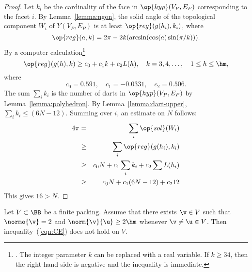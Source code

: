 \begin{proof}
Let $k_i$ be the cardinality of the face in $\op{hyp}(V_P,E_P)$
corresponding to the facet $i$.  By Lemma~\ref{lemma:ngon}, the solid
angle of the topological component $W_i$ of $Y(V_P,E_P)$ is at least
$\op{reg}(g(h_i),k_i)$, where %
%
%
\begin{displaymath} 
\op{reg}(a,k) = 2\pi - 2 k (\arcsin(\cos(a)\sin(\pi/k))).
\end{displaymath}
By a computer calculation\footnote{. 
The integer parameter $k$ can be replaced with a real variable.   If $k\ge34$, then
the right-hand-side is negative and the inequality is immediate.} 
\begin{equation}\label{eqn:alin} 
\op{reg}(g(h),k) \ge c_0 + c_1 k + c_2 L(h),\quad
k = 3,4,\ldots,\quad 1\le h\le \hm,
\end{equation}
where
\begin{displaymath}
c_0=0.591,\quad c_1=-0.0331,\quad c_2 = 0.506.
\end{displaymath} The sum $\sum_i k_i$ is the number of darts
in $\op{hyp}(V_P,E_P)$ by  Lemma~\ref{lemma:polyhedron}.  By
Lemma~\ref{lemma:dart-upper}, $\sum_i k_i \le (6N-12)$.  Summing over
$i$, an estimate on $N$ follows: 
%
%
\begin{eqnarray*} 
4\pi &=& \sum_i\op{sol}(W_i)\\
&\ge& \sum_i \op{reg}(g(h_i),k_i) \\
&\ge& c_0 N +c_1\sum_i k_i + c_2 \sum L(h_i)\\
&\ge& c_0 N +c_1 (6N-12) + c_2 12\\
\end{eqnarray*}
This gives
$16 > N$.
\end{proof} 


\begin{lemma}[]\label{lemma:D'}  
Let $ V\subset\BB$ be a finite packing.
Assume that there exists $ \v\in V$ such that $\normo{ \v}=2$ and
$\norm{ \v}{ \u}\ge 2\hm$ whenever $\v\ne\u\in V$.
Then  inequality~(\ref{eqn:CE}) does not hold on $ V$.
\end{lemma}

